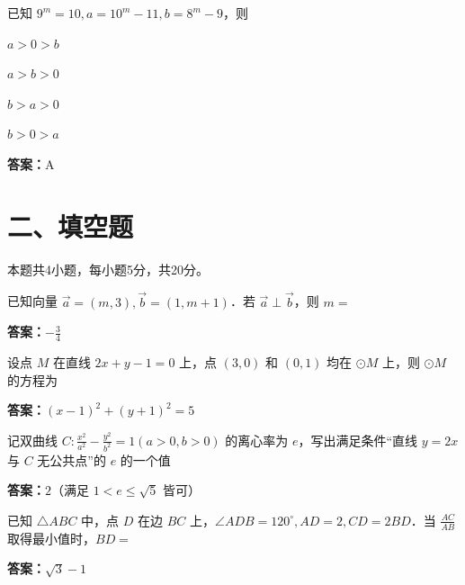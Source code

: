 \begin{question}[points=5]
已知 $9^m=10, a=10^m-11, b=8^m-9$，则
\begin{choices}
  \item $a>0>b$
  \item $a>b>0$
  \item $b>a>0$
  \item $b>0>a$
\end{choices}
\begin{solution}
\textbf{答案：}A
\end{solution}
\end{question}

\section*{二、填空题}
本题共4小题，每小题5分，共20分。

\begin{question}[points=5]
已知向量 $\vec{a}=(m,3),\vec{b}=(1,m+1)$．若 $\vec{a}\perp\vec{b}$，则 $m=$
\fillin[{$-\frac{3}{4}$}]
\begin{solution}
\textbf{答案：}$-\frac{3}{4}$
\end{solution}
\end{question}

\begin{question}[points=5]
设点 $M$ 在直线 $2x+y-1=0$ 上，点 $(3,0)$ 和 $(0,1)$ 均在 $\odot M$ 上，则 $\odot M$ 的方程为
\fillin[{$(x-1)^2+(y+1)^2=5$}]
\begin{solution}
\textbf{答案：}$(x-1)^2+(y+1)^2=5$
\end{solution}
\end{question}

\begin{question}[points=5]
记双曲线 $C:\frac{x^2}{a^2}-\frac{y^2}{b^2}=1(a>0,b>0)$ 的离心率为 $e$，写出满足条件“直线 $y=2x$ 与 $C$ 无公共点”的 $e$ 的一个值
\begin{solution}
\textbf{答案：}$2$（满足 $1<e\leq\sqrt{5}$ 皆可）
\end{solution}
\end{question}

\begin{question}[points=5]
已知 $\triangle ABC$ 中，点 $D$ 在边 $BC$ 上，$\angle ADB=120^\circ, AD=2, CD=2BD$．当 $\frac{AC}{AB}$ 取得最小值时，$BD=$
\fillin[{$\sqrt{3}-1$}]
\begin{solution}
\textbf{答案：}$\sqrt{3}-1$
\end{solution}
\end{question}

